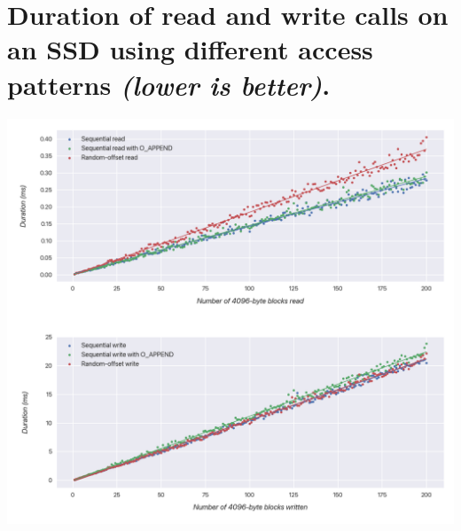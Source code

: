 \section{Duration of read and write calls on an SSD using different access patterns \textit{(lower is better)}.}

\label{app:disk-access}
\includegraphics[width=\textwidth]{images/disk_access.png}